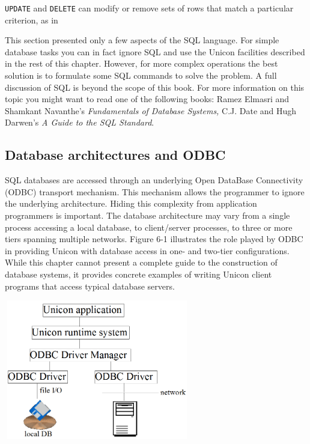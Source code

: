 \texttt{UPDATE} and \texttt{DELETE} can modify or remove sets of rows
that match a particular criterion, as in


This section presented only a few aspects of the SQL language. For
simple database tasks you can in fact ignore SQL and use the Unicon
facilities described in the rest of this chapter. However, for more
complex operations the best solution is to formulate some SQL commands
to solve the problem. A full discussion of SQL is beyond the scope of
this book. For more information on this topic you might want to read
one of the following books: Ramez Elmasri and Shamkant
Navanthe's \textit{Fundamentals of Database Systems,}
C.J. Date and Hugh Darwen's \textit{A Guide to the SQL Standard}.

\subsection*{Database architectures and ODBC}

SQL databases are accessed through an underlying Open
DataBase Connectivity (ODBC) transport mechanism. This mechanism allows
the programmer to ignore the underlying architecture. Hiding this
complexity from application programmers is important. The database
architecture may vary from a single process accessing a local database,
to client/server processes, to three or more tiers spanning multiple
networks. Figure 6-1 illustrates the role played by ODBC in providing
Unicon with database access in one- and two-tier configurations. While
this chapter cannot present a complete guide to the construction of
database systems, it provides concrete examples of writing Unicon
client programs that access typical database servers.

\begin{center}
\includegraphics[width=3.2in,height=2.4in]{ub-img/odbcarch.png}
\end{center}

